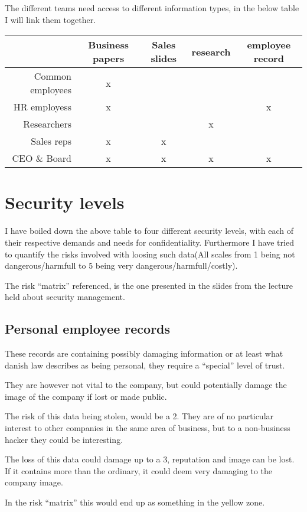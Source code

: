 \documentclass[paper=a4, fontsize=11pt]{scrartcl} %
\numberwithin{equation}{section} %
\numberwithin{figure}{section} %
\numberwithin{table}{section} %
\begin{document}
The different teams need access to different information types, in the below
table I will link them together.

\begin{tabular}{r | c | c | c | c}
 & Business papers & Sales slides & research & employee record \\ \hline
Common employees & x &   &   &   \\ \hline
HR employess     & x &   &   & x \\ \hline
Researchers      &   &   & x &   \\ \hline
Sales reps       & x & x &   &   \\ \hline
CEO \& Board     & x & x & x & x \\
\end{tabular}

\section{Security levels}
I have boiled down the above table to four different security levels, with each
of their respective demands and needs for confidentiality. Furthermore I have
tried to quantify the risks involved with loosing such data(All scales from 1
being not dangerous/harmfull to 5 being very dangerous/harmfull/costly).

The risk ``matrix'' referenced, is the one presented in the slides from the
lecture held about security management.

\subsection{Personal employee records}
These records are containing possibly damaging information or at least what
danish law describes as being personal, they require a ``special'' level of
trust.

They are however not vital to the company, but could potentially damage the
image of the company if lost or made public.

The risk of this data being stolen, would be a 2. They are of no particular
interest to other companies in the same area of business, but to a non-business
hacker they could be interesting.

The loss of this data could damage up to a 3, reputation and image can be lost.
If it contains more than the ordinary, it could deem very damaging to the
company image.

In the risk ``matrix'' this would end up as something in the yellow zone.
\end{document}
